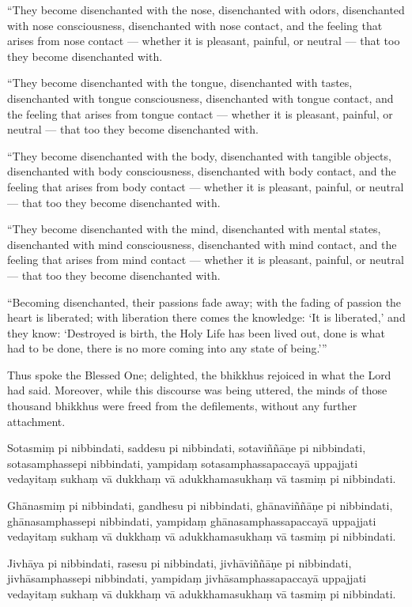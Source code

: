 ``They become disenchanted with the nose, disenchanted with odors,
disenchanted with nose consciousness, disenchanted with nose contact,
and the feeling that arises from nose contact --- whether it is pleasant,
painful, or neutral --- that too they become disenchanted with.

``They become disenchanted with the tongue, disenchanted with tastes,
disenchanted with tongue consciousness, disenchanted with tongue
contact, and the feeling that arises from tongue contact --- whether it is
pleasant, painful, or neutral --- that too they become disenchanted with.

``They become disenchanted with the body, disenchanted with tangible
objects, disenchanted with body consciousness, disenchanted with body
contact, and the feeling that arises from body contact --- whether it is
pleasant, painful, or neutral --- that too they become disenchanted with.

``They become disenchanted with the mind, disenchanted with mental
states, disenchanted with mind consciousness, disenchanted with mind
contact, and the feeling that arises from mind contact --- whether it is
pleasant, painful, or neutral --- that too they become disenchanted with.

``Becoming disenchanted, their passions fade away; with the fading of
passion the heart is liberated; with liberation there comes the
knowledge: `It is liberated,' and they know: `Destroyed is birth, the
Holy Life has been lived out, done is what had to be done, there is no
more coming into any state of being.'\thinspace ''

Thus spoke the Blessed One; delighted, the bhikkhus rejoiced in what the
Lord had said. Moreover, while this discourse was being uttered, the
minds of those thousand bhikkhus were freed from the defilements,
without any further attachment.

\clearpage

\paliText

Sotasmiṃ pi nibbindati, saddesu pi nibbindati, sotaviññāṇe pi
nibbindati, sotasamphassepi nibbindati, yampidaṃ sotasamphassapaccayā
uppajjati vedayitaṃ sukhaṃ vā dukkhaṃ vā adukkhamasukhaṃ vā tasmiṃ pi
nibbindati.

Ghānasmiṃ pi nibbindati, gandhesu pi nibbindati, ghānaviññāṇe pi
nibbindati, ghānasamphassepi nibbindati, yampidaṃ ghānasamphassapaccayā
uppajjati vedayitaṃ sukhaṃ vā dukkhaṃ vā adukkhamasukhaṃ vā tasmiṃ pi
nibbindati.

Jivhāya pi nibbindati, rasesu pi nibbindati, jivhāviññāṇe pi nibbindati,
jivhāsamphassepi nibbindati, yampidaṃ jivhāsamphassapaccayā uppajjati
vedayitaṃ sukhaṃ vā dukkhaṃ vā adukkhamasukhaṃ vā tasmiṃ pi nibbindati.

